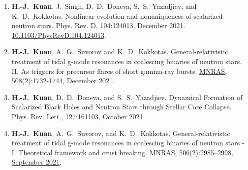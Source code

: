 \documentclass[10pt,floatfix,a4paper]{article}
\begin{document}
\begin{enumerate}
	\item \textbf{H.-J.~Kuan}, J.~Singh, D.~D.~Doneva, S.~S.~Yazadjiev, and K.~D.~Kokkotas. Nonlinear evolution and nonuniqueness of scalarized neutron stars. Phys. Rev. D, 104:124013, December 2021. \href{https://doi.org/10.1103/PhysRevD.104.124013}{10.1103/PhysRevD.104.124013}.
	\item  \textbf{H.-J.~Kuan}, A.~G.~Suvorov and K.~D.~Kokkotas. General-relativistic treatment of tidal g-mode resonances in coalescing binaries of neutron stars. II. As triggers for precursor flares of short gamma-ray bursts. \href{https://doi.org/10.1093/mnras/stab2658}{MNRAS, 508(2):1732-1744, December 2021}.
	\item \textbf{H.-J.~Kuan}, D.~D.~Doneva, and S.~S.~Yazadjiev. Dynamical Formation of Scalarized Black Holes and Neutron Stars through Stellar Core Collapse. \href{https://doi.org/10.1103/PhysRevLett.127.161103}{Phys. Rev. Lett., 127:161103, October 2021}.
	\item \textbf{H.-J.~Kuan}, A.~G.~Suvorov, and K.~D.~Kokkotas. General-relativistic treatment of tidal g-mode resonances in coalescing binaries of neutron stars - I. Theoretical framework and crust breaking. \href{https://doi.org/10.1093/mnras/stab1898}{MNRAS, 506(2):2985–2998, September 2021}.
\end{enumerate}
\end{document}
